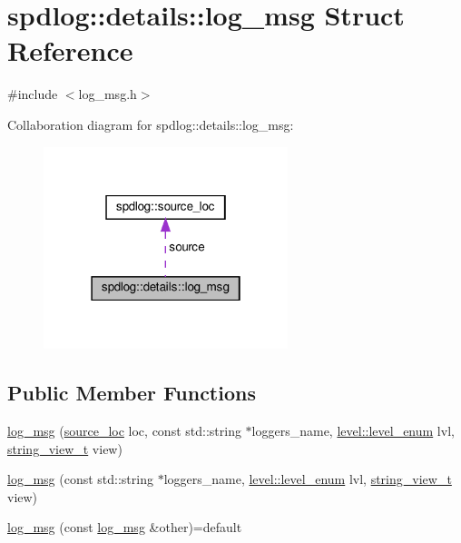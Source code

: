 \hypertarget{structspdlog_1_1details_1_1log__msg}{}\section{spdlog\+:\+:details\+:\+:log\+\_\+msg Struct Reference}
\label{structspdlog_1_1details_1_1log__msg}


{\ttfamily \#include $<$log\+\_\+msg.\+h$>$}



Collaboration diagram for spdlog\+:\+:details\+:\+:log\+\_\+msg\+:
\nopagebreak
\begin{figure}[H]
\begin{center}
\leavevmode
\includegraphics[width=202pt]{structspdlog_1_1details_1_1log__msg__coll__graph}
\end{center}
\end{figure}
\subsection*{Public Member Functions}
\begin{DoxyCompactItemize}
\item 
\hyperlink{structspdlog_1_1details_1_1log__msg_af08273268386a97a4e4a02505f830318}{log\+\_\+msg} (\hyperlink{structspdlog_1_1source__loc}{source\+\_\+loc} loc, const std\+::string $\ast$loggers\+\_\+name, \hyperlink{namespacespdlog_1_1level_a35f5227e5daf228d28a207b7b2aefc8b}{level\+::level\+\_\+enum} lvl, \hyperlink{namespacespdlog_af48e310b2f366ac6544701e6a3b56247}{string\+\_\+view\+\_\+t} view)
\item 
\hyperlink{structspdlog_1_1details_1_1log__msg_aed741a89e884b8f51db4fd6364402e7a}{log\+\_\+msg} (const std\+::string $\ast$loggers\+\_\+name, \hyperlink{namespacespdlog_1_1level_a35f5227e5daf228d28a207b7b2aefc8b}{level\+::level\+\_\+enum} lvl, \hyperlink{namespacespdlog_af48e310b2f366ac6544701e6a3b56247}{string\+\_\+view\+\_\+t} view)
\item 
\hyperlink{structspdlog_1_1details_1_1log__msg_ad3ff125f04a5854bf78f6c359af5183a}{log\+\_\+msg} (const \hyperlink{structspdlog_1_1details_1_1log__msg}{log\+\_\+msg} \&other)=default
\end{DoxyCompactItemize}
